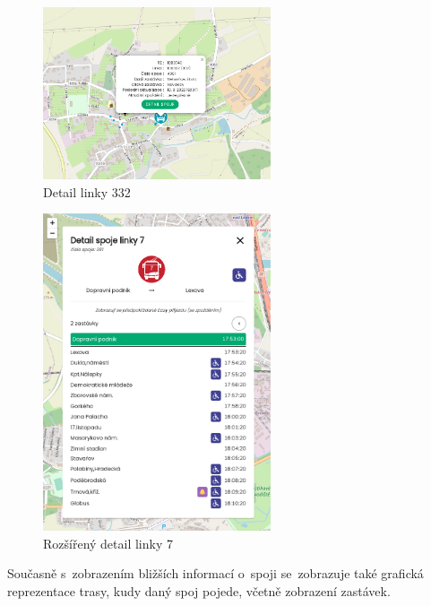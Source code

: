 \begin{figure}[H]
    \centering
    \includegraphics[width=0.6\textwidth]{images/small_detail.png}
    \caption{Detail linky 332}
    \label{detail332}
\end{figure}

\begin{figure}[H]
    \centering
    \includegraphics[width=0.6\textwidth]{images/global_pce_con_detail_7.png}
    \caption{Rozšířený detail linky 7}
    \label{detail7}
\end{figure}
\newpage
Současně s~zobrazením bližších informací o~spoji se~zobrazuje také grafická reprezentace trasy, kudy daný spoj pojede, včetně zobrazení zastávek.

